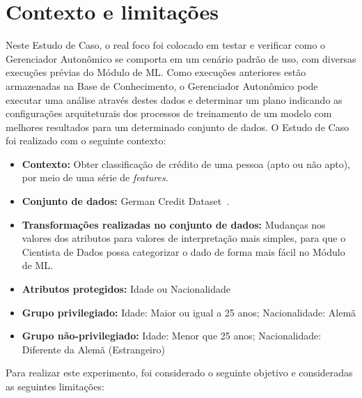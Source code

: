 \documentclass[Portugues,Final]{ic-tese-v3}
\begin{document}
\section{Contexto e limitações}

Neste Estudo de Caso, o real foco foi colocado em testar e verificar como o Gerenciador Autonômico se comporta em um cenário padrão de uso, com diversas execuções prévias do Módulo de ML. Como execuções anteriores estão armazenadas na Base de Conhecimento, o Gerenciador Autonômico pode executar uma análise através destes dados e determinar um plano indicando as configurações arquiteturais dos processos de treinamento de um modelo com melhores resultados para um determinado conjunto de dados. O Estudo de Caso foi realizado com o seguinte contexto:

\begin{itemize}
\item \textbf{Contexto:} Obter classificação de crédito de uma pessoa (apto ou não apto), por meio de uma série de \textit{features}.

\item \textbf{Conjunto de dados:} German Credit Dataset~\cite{ucigerman_2021}.

\item \textbf{Transformações realizadas no conjunto de dados:} Mudanças nos valores dos atributos para valores de interpretação mais simples, para que o Cientista de Dados possa categorizar o dado de forma mais fácil no Módulo de ML.

\item \textbf{Atributos protegidos:} Idade ou Nacionalidade

\item \textbf{Grupo privilegiado:} Idade: Maior ou igual a 25 anos; Nacionalidade: Alemã

\item \textbf{Grupo não-privilegiado:} Idade: Menor que 25 anos; Nacionalidade: Diferente da Alemã (Estrangeiro)

\end{itemize}

Para realizar este experimento, foi considerado o seguinte objetivo e consideradas as seguintes limitações:
\end{document}

